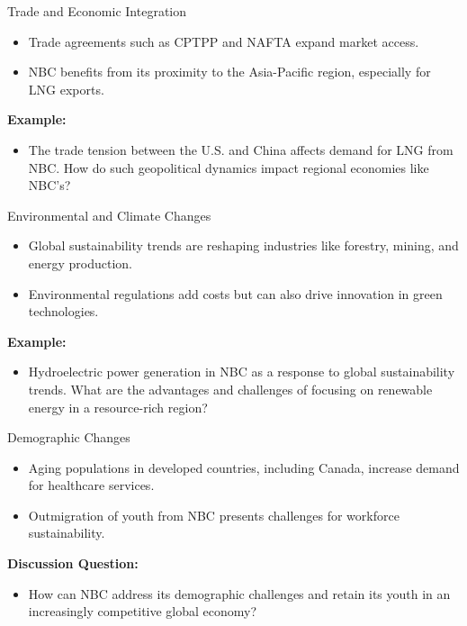 \documentclass{beamer}
\begin{document}
\begin{frame}{Trade and Economic Integration}
    \begin{itemize}
        \item Trade agreements such as CPTPP and NAFTA expand market access.
        \item NBC benefits from its proximity to the Asia-Pacific region, especially for LNG exports.
    \end{itemize}
    \textbf{Example:}
    \begin{itemize}
        \item The trade tension between the U.S. and China affects demand for LNG from NBC. How do such geopolitical dynamics impact regional economies like NBC’s?
    \end{itemize}
\end{frame}

\begin{frame}{Environmental and Climate Changes}
    \begin{itemize}
        \item Global sustainability trends are reshaping industries like forestry, mining, and energy production.
        \item Environmental regulations add costs but can also drive innovation in green technologies.
    \end{itemize}
    \textbf{Example:}
    \begin{itemize}
        \item Hydroelectric power generation in NBC as a response to global sustainability trends. What are the advantages and challenges of focusing on renewable energy in a resource-rich region?
    \end{itemize}
\end{frame}

\begin{frame}{Demographic Changes}
    \begin{itemize}
        \item Aging populations in developed countries, including Canada, increase demand for healthcare services.
        \item Outmigration of youth from NBC presents challenges for workforce sustainability.
    \end{itemize}
    \textbf{Discussion Question:}
    \begin{itemize}
        \item How can NBC address its demographic challenges and retain its youth in an increasingly competitive global economy?
    \end{itemize}
\end{frame}
\end{document}
